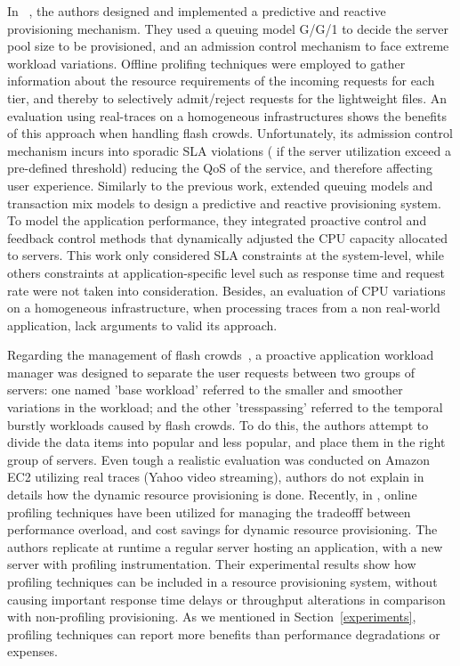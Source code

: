 In ~\cite{urgaonkar_cataclysm:_2008, urgaonkar_agile_2008}, the authors designed and implemented a predictive and reactive provisioning mechanism. They used a queuing model  G/G/1 to decide the server pool size to be provisioned, and an admission control mechanism to face extreme workload variations. Offline prolifing techniques were employed to gather information about the resource requirements of the incoming requests for each tier, and thereby to selectively admit/reject requests for the lightweight files.  An evaluation using real-traces on a homogeneous infrastructures shows the benefits of this approach when handling flash crowds. Unfortunately, its admission control mechanism incurs into sporadic SLA violations ( if the server utilization exceed a pre-defined threshold) reducing the QoS of the service, and therefore affecting user experience. Similarly to the previous work, \cite{wang_appraise:_2009} extended queuing models and transaction mix models to design a predictive and reactive provisioning system. To model the application performance, they integrated proactive control and feedback control methods that dynamically adjusted the CPU capacity allocated to servers. This work only considered SLA constraints at the system-level, while others constraints at application-specific level such as response time and request rate were not taken into consideration. Besides, an evaluation of CPU variations on a homogeneous infrastructure, when processing traces from a non real-world application, lack arguments to valid its approach.


Regarding the management of flash crowds~\cite{zhang_resilient_2009}, a proactive application workload manager was designed to separate the user requests between two groups of servers:  one  named  'base workload'  referred to the smaller and smoother variations in the workload; and the other 'tresspassing' referred to the temporal burstly workloads caused by flash crowds. To do this, the authors attempt to divide the data items into popular and less popular, and place them in the right group of servers. Even tough a realistic evaluation was conducted on Amazon EC2 utilizing real traces (Yahoo video streaming), authors do not explain in details how the dynamic resource provisioning is done. Recently, in  \cite{kaviani_profiling-as--service:_2011}, online profiling techniques have been utilized for managing the tradeofff between performance overload, and cost savings for dynamic resource provisioning. The authors replicate at runtime a regular server hosting an application, with a new server with profiling instrumentation. Their experimental results show how profiling techniques can be included in a resource provisioning system, without causing important response time delays or throughput alterations in comparison with non-profiling provisioning. As we mentioned in Section~\ref{experiments}, profiling techniques can report more benefits than  performance degradations or expenses.


